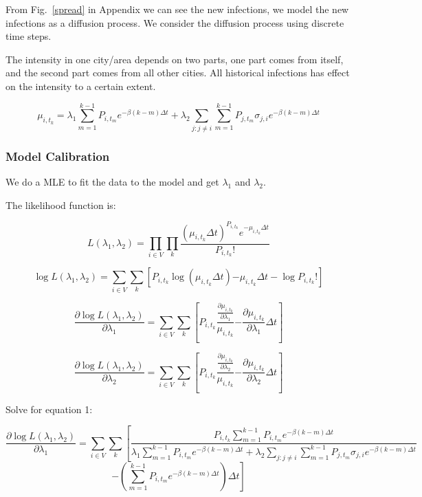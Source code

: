 \documentclass[11pt]{article}
\begin{document}
From Fig.~\ref{spread} in Appendix we can see the new infections, we model the new infections as a diffusion process. We consider the diffusion process using discrete time steps.


The intensity in one city/area depends on two parts, one part comes from itself, and the second part comes from all other cities. All historical infections has effect on the intensity to a certain extent.


$$\mu_{i,t_k} = \lambda_1 \sum_{m = 1}^{ k-1} P_{i,t_m} e^{-\beta(k-m)\Delta t} + \lambda_2 \sum_{j:j\neq i} \sum_{m = 1}^{ k-1} P_{j,t_m} \sigma_{j,i} e^{-\beta(k-m)\Delta t }$$

\subsubsection{Model Calibration}

We do a MLE to fit the data to the model and get $\lambda_1$ and $\lambda_2$.

The likelihood function is:

$$L(\lambda_1, \lambda_2) = \prod_{i \in V} \prod_{k} \frac{(\mu_{i,t_k}\Delta t)^{P_{i,t_k}} e^{-\mu_{i,t_k}\Delta t}}{P_{i,t_k}!}
$$


$$
\log L(\lambda_1, \lambda_2) = \sum_{i \in V} \sum_{k}\left[ {P_{i,t_k} \log{(\mu_{i,t_k}\Delta t)} {-\mu_{i,t_k}\Delta t}} - \log{P_{i,t_k}!} \right]
$$


$$
\frac{\partial \log L(\lambda_1, \lambda_2)}{\partial \lambda_1} = \sum_{i \in V} \sum_{k}\left[ {P_{i,t_k} \frac{ \frac{\partial \mu_{i,t_k}}{\partial \lambda_1}}{\mu_{i,t_k}} {- \frac{\partial \mu_{i,t_k}}{\partial \lambda_1}\Delta t}} \right] 
$$


$$
\frac{\partial \log L(\lambda_1, \lambda_2)}{\partial \lambda_2} = \sum_{i \in V} \sum_{k}\left[ {P_{i,t_k} \frac{ \frac{\partial \mu_{i,t_k}}{\partial \lambda_2}}{\mu_{i,t_k}} {- \frac{\partial \mu_{i,t_k}}{\partial \lambda_2}\Delta t}} \right] 
$$

Solve for equation 1:

$$
\frac{\partial \log L(\lambda_1, \lambda_2)}{\partial \lambda_1} = \sum_{i \in V} \sum_{k}\left[ { \frac{P_{i,t_k}\sum_{m = 1}^{ k-1} P_{i,t_m} e^{-\beta(k-m)\Delta t}}{ \lambda_1 \sum_{m = 1}^{ k-1} P_{i,t_m} e^{-\beta(k-m)\Delta t} + \lambda_2 \sum_{j:j\neq i} \sum_{m = 1}^{ k-1} P_{j,t_m} \sigma_{j,i} e^{-\beta(k-m)\Delta t}}} \right.
$$
$$
\left. {- \left( \sum_{m = 1}^{ k-1} P_{i,t_m} e^{-\beta(k-m)\Delta t} \right)\Delta t} \right] 
$$
\end{document}
